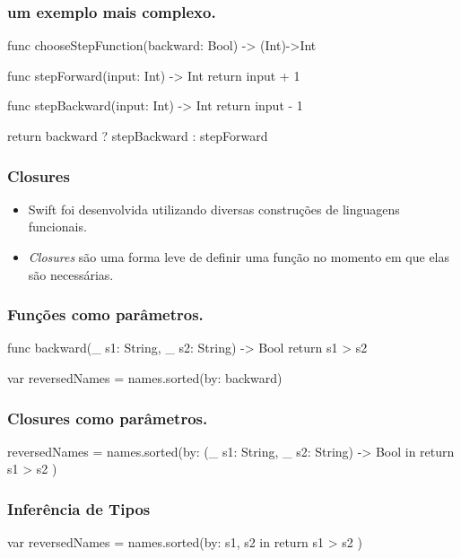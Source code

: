 \begin{frame}[fragile]
    \frametitle{um exemplo mais complexo.}

    \begin{swift}[basicstyle=\small]
func chooseStepFunction(backward: Bool) -> (Int)->Int
{
    func stepForward(input: Int) -> Int
    { return input + 1 }

    func stepBackward(input: Int) -> Int
    { return input - 1 }

    return backward ? stepBackward : stepForward
}
    \end{swift}
\end{frame}

\begin{frame}[fragile]
    \frametitle{Closures}

    \begin{itemize}
        \item Swift foi desenvolvida utilizando diversas construções de
        linguagens funcionais.
        \item \textit{Closures} são uma forma leve de definir uma função
        no momento em que elas são necessárias.
    \end{itemize}
\end{frame}

\begin{frame}[fragile]
    \frametitle{Funções como parâmetros.}

    \begin{swift}[basicstyle=\small]
func backward(_ s1: String, _ s2: String) -> Bool {
    return s1 > s2
}

var reversedNames = names.sorted(by: backward)
    \end{swift}
\end{frame}

\begin{frame}[fragile]
    \frametitle{Closures  como parâmetros.}

    \begin{swift}
reversedNames = names.sorted(by: {
    (_ s1: String, _ s2: String) -> Bool in
        return s1 > s2
})
    \end{swift}
\end{frame}

\begin{frame}[fragile]
    \frametitle{Inferência de Tipos}

    \begin{swift}
  var reversedNames = names.sorted(by: {
            s1, s2 in return s1 > s2
        })
    \end{swift}
\end{frame}

